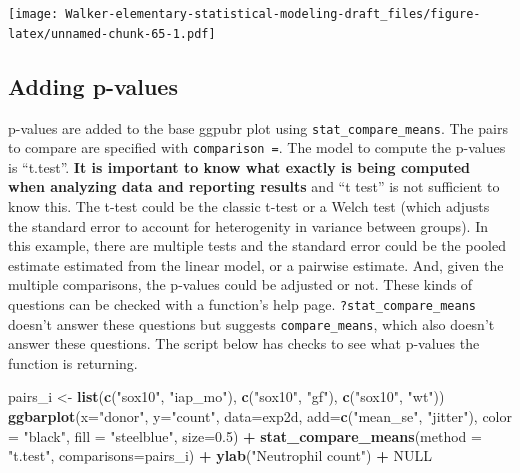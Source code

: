 \documentclass[]{book}
\newenvironment{Shaded}{\begin{snugshade}}{\end{snugshade}}
\newcommand{\KeywordTok}[1]{\textcolor[rgb]{0.13,0.29,0.53}{\textbf{#1}}}
\newcommand{\DataTypeTok}[1]{\textcolor[rgb]{0.13,0.29,0.53}{#1}}
\newcommand{\FloatTok}[1]{\textcolor[rgb]{0.00,0.00,0.81}{#1}}
\newcommand{\StringTok}[1]{\textcolor[rgb]{0.31,0.60,0.02}{#1}}
\newcommand{\OtherTok}[1]{\textcolor[rgb]{0.56,0.35,0.01}{#1}}
\newcommand{\OperatorTok}[1]{\textcolor[rgb]{0.81,0.36,0.00}{\textbf{#1}}}
\newcommand{\NormalTok}[1]{#1}
\begin{document}
\texttt{[image: Walker-elementary-statistical-modeling-draft\_files/figure-latex/unnamed-chunk-65-1.pdf]}

\subsection{Adding p-values}\label{adding-p-values}

p-values are added to the base ggpubr plot using
\texttt{stat\_compare\_means}. The pairs to compare are specified with
\texttt{comparison\ =}. The model to compute the p-values is ``t.test''.
\textbf{It is important to know what exactly is being computed when
analyzing data and reporting results} and ``t test'' is not sufficient
to know this. The t-test could be the classic t-test or a Welch test
(which adjusts the standard error to account for heterogenity in
variance between groups). In this example, there are multiple tests and
the standard error could be the pooled estimate estimated from the
linear model, or a pairwise estimate. And, given the multiple
comparisons, the p-values could be adjusted or not. These kinds of
questions can be checked with a function's help page.
\texttt{?stat\_compare\_means} doesn't answer these questions but
suggests \texttt{compare\_means}, which also doesn't answer these
questions. The script below has checks to see what p-values the function
is returning.

\begin{Shaded}
\begin{Highlighting}[]
\NormalTok{pairs_i <-}\StringTok{ }\KeywordTok{list}\NormalTok{(}\KeywordTok{c}\NormalTok{(}\StringTok{"sox10"}\NormalTok{, }\StringTok{"iap_mo"}\NormalTok{), }\KeywordTok{c}\NormalTok{(}\StringTok{"sox10"}\NormalTok{, }\StringTok{"gf"}\NormalTok{), }\KeywordTok{c}\NormalTok{(}\StringTok{"sox10"}\NormalTok{, }\StringTok{"wt"}\NormalTok{))}
\KeywordTok{ggbarplot}\NormalTok{(}\DataTypeTok{x=}\StringTok{"donor"}\NormalTok{, }
          \DataTypeTok{y=}\StringTok{"count"}\NormalTok{, }
          \DataTypeTok{data=}\NormalTok{exp2d,}
          \DataTypeTok{add=}\KeywordTok{c}\NormalTok{(}\StringTok{"mean_se"}\NormalTok{, }\StringTok{"jitter"}\NormalTok{),}
          \DataTypeTok{color =} \StringTok{"black"}\NormalTok{,}
          \DataTypeTok{fill =} \StringTok{"steelblue"}\NormalTok{,}
          \DataTypeTok{size=}\FloatTok{0.5}\NormalTok{) }\OperatorTok{+}
\StringTok{  }\KeywordTok{stat_compare_means}\NormalTok{(}\DataTypeTok{method =} \StringTok{"t.test"}\NormalTok{, }\DataTypeTok{comparisons=}\NormalTok{pairs_i) }\OperatorTok{+}
\StringTok{  }\KeywordTok{ylab}\NormalTok{(}\StringTok{"Neutrophil count"}\NormalTok{) }\OperatorTok{+}
\StringTok{  }\OtherTok{NULL}
\end{Highlighting}
\end{Shaded}
\end{document}
